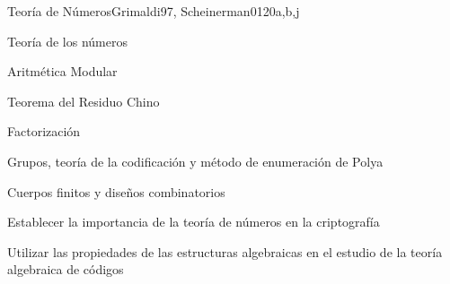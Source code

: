 \begin{syllabus}
\begin{unit}{Teoría de Números}{}{Grimaldi97, Scheinerman01}{20}{a,b,j}
   \begin{topics}
      \item Teoría de los números
      \item Aritmética  Modular
      \item Teorema del Residuo Chino
      \item Factorización
      \item Grupos, teoría de la codificación y método de enumeración de Polya
      \item Cuerpos finitos y diseños combinatorios
   \end{topics}

   \begin{learningoutcomes}
      \item Establecer la importancia de la teoría de números en la criptografía
      \item Utilizar las propiedades de las estructuras algebraicas en el estudio de la teoría algebraica de códigos
   \end{learningoutcomes}
\end{unit}

\begin{coursebibliography}
\end{coursebibliography}

\end{syllabus}

%

